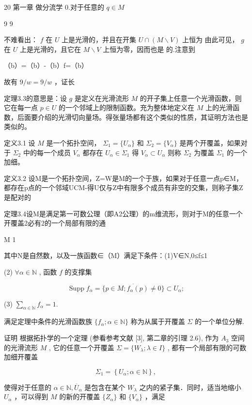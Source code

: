 20 第一章 做分流学 0.对于任意的  $q\in M$

9 9

不难看出：  $f$  在  $U$  上是光滑的，并且在开集  $U\cap (M\backslash V)$  上恒为 由此可见，  $g$  在  $U$  上是光滑的，且它在  $M\backslash V$  上恒为零，因而也是 的.注意到

（b）=（b）-（b）f=（b）

故有  $9 / w = 9 / w$  ，证长

定理3.3的意思是：设  $g$  是定义在光滑流形  $M$  的开子集上任意一个光滑函数，则它在每一点  $p \in U$  的一个邻域上的限制函数。充为整体地定义在  $M$  上的光滑函数，后面要介绍的光滑切向量场。得张量场都有这个类似的性质，其证明方法也是类似的。

定义3.1 设  $M$  是一个拓扑空间， $\Sigma_1 = \{U_\alpha\}$  和  $\Sigma_2 = \{V_\alpha\}$  是两个开覆盖，如果对于  $\Sigma_2$  中的每一个成员  $V_\alpha$  都存在  $U_\alpha \in \Sigma_1$  得  $V_\alpha \subset U_\alpha$  则称  $\Sigma_2$  为覆盖  $\Sigma_1$  的一个加细。

定义3.2 设M是一个拓扑空间，Z={W}是M的一个于族，如果对于任意一点p∈M，都存在p点的一个邻域UCM-得U仅与Z中有限多个成员有非空的交集，则称子集Z是配对的

定理3.4设M是满足第一可数公理（即A2公理）的m维流形，则对于M的任意一个开覆盖2必有2的一个局部有限的通

M 1

其中N是自然数，以及一族函数∈（M）满足下条件：(1)V∈N,0≤f≤1

(2)  $\forall \alpha \in \mathbb{N}$ , 函数  $f$  的支撑集

$$
\operatorname {S u p p} f _ {\alpha} = \overline {{\{p \in M ; f _ {\alpha} (p) \neq 0 \}}} \subset U _ {\alpha};
$$

(3)  $\sum_{\alpha \in \mathbb{N}}f_{\alpha} = 1.$

满足定理中条件的光滑函数族  $\{f_{\alpha}; \alpha \in \mathbb{N}\}$  称为从属于开覆盖  $\Sigma$  的一个单位分解.

证明 根据拓扑学的一个定理 (参看参考文献 [3], 第二章的引理 2.6), 作为  $A_{3}$  空间的光滑流形  $M$ , 它的任意一个开覆盖  $\Sigma = \{W_{\lambda}; \lambda \in I\}$ , 都有一个局部有限的可数加细开覆盖

$$
\Sigma_ {1} = \left\{U _ {\alpha}; \alpha \in \mathbb {N} \right\},
$$

使得对于任意的  $\alpha \in \mathbb{N},\overline{U}_{\alpha}$  是包含在某个  $W_{\lambda}$  之内的紧子集．同时，适当地缩小  $U_{\alpha}$  ，可以得到  $M$  的新的开覆盖  $\{Z_{\alpha}\}$  和  $\{V_{\alpha}\}$  ，满足

